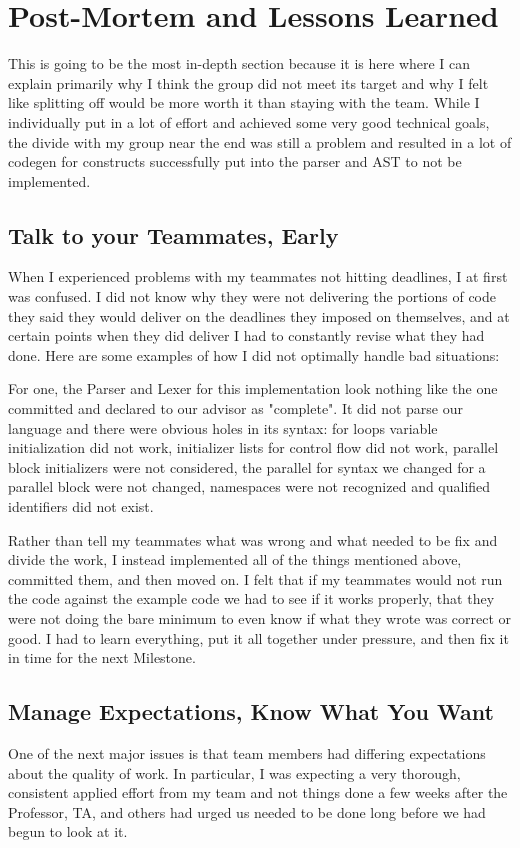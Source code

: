\chapter{Post-Mortem and Lessons Learned}

This is going to be the most in-depth section because it is here where I can explain primarily why I think the group did not meet its target and why I felt like splitting off would be more worth it than staying with the team. While I individually put in a lot of effort and achieved some very good technical goals, the divide with my group near the end was still a problem and resulted in a lot of codegen for constructs successfully put into the parser and AST to not be implemented.

\section{Talk to your Teammates, Early}
When I experienced problems with my teammates not hitting deadlines, I at first was confused. I did not know why they were not delivering the portions of code they said they would deliver on the deadlines they imposed on themselves, and at certain points when they did deliver I had to constantly revise what they had done. Here are some examples of how I did not optimally handle bad situations:

For one, the Parser and Lexer for this \lepix{} implementation look nothing like the one committed and declared to our advisor as "complete". It did not parse our language and there were obvious holes in its syntax: for loops variable initialization did not work, initializer lists for control flow did not work, parallel block initializers were not considered, the parallel for syntax we changed for a parallel block were not changed, namespaces were not recognized and qualified identifiers did not exist.

Rather than tell my teammates what was wrong and what needed to be fix and divide the work, I instead implemented all of the things mentioned above, committed them, and then moved on. I felt that if my teammates would not run the code against the example \lepix{} code we had to see if it works properly, that they were not doing the bare minimum to even know if what they wrote was correct or good. I had to learn everything, put it all together under pressure, and then fix it in time for the next Milestone.

\section{Manage Expectations, Know What You Want}
One of the next major issues is that team members had differing expectations about the quality of work. In particular, I was expecting a very thorough, consistent applied effort from my team and not things done a few weeks after the Professor, TA, and others had urged us needed to be done long before we had begun to look at it.

